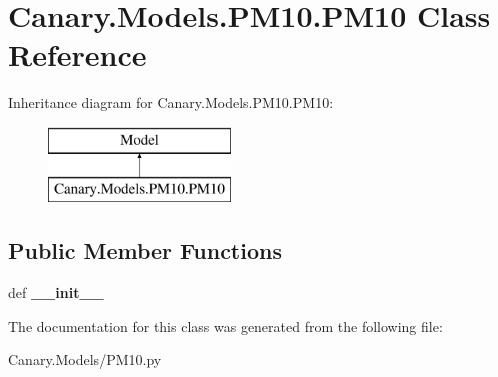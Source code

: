 \hypertarget{class_canary_8_models_1_1_p_m10_1_1_p_m10}{\section{Canary.\-Models.\-P\-M10.\-P\-M10 Class Reference}
\label{class_canary_8_models_1_1_p_m10_1_1_p_m10}
}
Inheritance diagram for Canary.\-Models.\-P\-M10.\-P\-M10\-:\begin{figure}[H]
\begin{center}
\leavevmode
\includegraphics[height=2.000000cm]{class_canary_8_models_1_1_p_m10_1_1_p_m10}
\end{center}
\end{figure}
\subsection*{Public Member Functions}
\begin{DoxyCompactItemize}
\item 
\hypertarget{class_canary_8_models_1_1_p_m10_1_1_p_m10_a8e9ba849c969268d7d26564fe1e573c2}{def {\bfseries \-\_\-\-\_\-init\-\_\-\-\_\-}}\label{class_canary_8_models_1_1_p_m10_1_1_p_m10_a8e9ba849c969268d7d26564fe1e573c2}

\end{DoxyCompactItemize}


The documentation for this class was generated from the following file\-:\begin{DoxyCompactItemize}
\item 
Canary.\-Models/P\-M10.\-py\end{DoxyCompactItemize}
